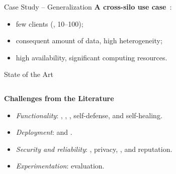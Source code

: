 \begin{frame}{Case Study -- Generalization}
  \textbf{A cross-silo use case}~\cite{kairouz_AdvancesOpenProblems_2021}:
  \begin{itemize}
    \item few clients (\ie, 10--100);
    \item consequent amount of data, high heterogeneity;
    \item high availability, significant computing resources.
  \end{itemize}
\end{frame}


\begin{frame}{State of the Art}
  
  \begin{columns}
    \begin{column}{.45\textwidth}

      \textbf{Challenges from the Literature}~\autocite{lavaur_tnsm_2022}
      \begin{itemize}[<+->]
        \item \emph{Functionality}: , , , self-defense, and self-healing.
        \item \emph{Deployment}:  and .
        \item \emph{Security and reliability}: , privacy, , and reputation.
        \item \emph{Experimentation}: evaluation.
      \end{itemize}
    \end{column}
    \begin{column}{.55\textwidth}
    \end{column}
  \end{columns}

\end{frame}


